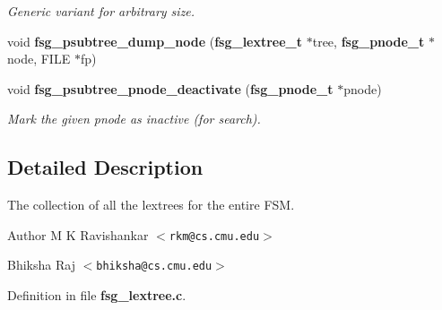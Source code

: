 \begin{DoxyCompactItemize}
\begin{DoxyCompactList}\small\item\em \-Generic variant for arbitrary size. \end{DoxyCompactList}\item 
void {\bfseries fsg\-\_\-psubtree\-\_\-dump\-\_\-node} ({\bf fsg\-\_\-lextree\-\_\-t} $\ast$tree, {\bf fsg\-\_\-pnode\-\_\-t} $\ast$node, \-F\-I\-L\-E $\ast$fp)\label{fsg__lextree_8c_a1d3204e8ce39bcb66c68b9ef1e2acb7d}

\item 
void {\bf fsg\-\_\-psubtree\-\_\-pnode\-\_\-deactivate} ({\bf fsg\-\_\-pnode\-\_\-t} $\ast$pnode)\label{fsg__lextree_8c_a6dc55ff3873855fb7b2c0390aa072516}

\begin{DoxyCompactList}\small\item\em \-Mark the given pnode as inactive (for search). \end{DoxyCompactList}\end{DoxyCompactItemize}


\subsection{\-Detailed \-Description}
\-The collection of all the lextrees for the entire \-F\-S\-M. \begin{DoxyAuthor}{\-Author}
\-M \-K \-Ravishankar $<${\tt rkm@cs.\-cmu.\-edu}$>$ 

\-Bhiksha \-Raj $<${\tt bhiksha@cs.\-cmu.\-edu}$>$ 
\end{DoxyAuthor}


\-Definition in file {\bf fsg\-\_\-lextree.\-c}.

